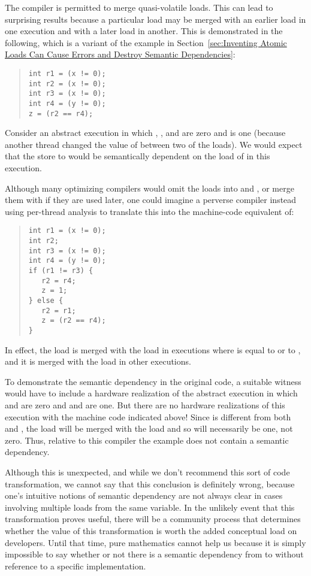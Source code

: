 The compiler is permitted to merge quasi-volatile loads.
This can lead to surprising results because a particular load
may be merged with an earlier load in one execution and with a
later load in another.
This is demonstrated in the following, which is a variant of
the example in
Section~\ref{sec:Inventing Atomic Loads Can Cause Errors and
Destroy Semantic Dependencies}:
\begin{quote}
\begin{verbatim}
int r1 = (x != 0);
int r2 = (x != 0);
int r3 = (x != 0);
int r4 = (y != 0);
z = (r2 == r4);
\end{verbatim}
\end{quote}
Consider an abstract execution in which , , and 
are zero and  is one (because another thread changed the value
of  between two of the loads).
We would expect that the store to  would be semantically
dependent on the load of  in this execution.

Although many optimizing compilers would omit the loads into 
and , or merge them with  if they are used later, one
could imagine a perverse compiler instead using per-thread analysis to
translate this into the machine-code equivalent of:
\begin{quote}
\begin{verbatim}
int r1 = (x != 0);
int r2;
int r3 = (x != 0);
int r4 = (y != 0);
if (r1 != r3) {
   r2 = r4;
   z = 1;
} else {
   r2 = r1;
   z = (r2 == r4);
}
\end{verbatim}
\end{quote}
In effect, the  load is merged with the  load in
executions where  is equal to  or to , and it is
merged with the  load in other executions.

To demonstrate the semantic dependency in the original code,
a suitable witness would have
to include a hardware realization of the abstract execution in which
 and  are zero and  and  are one.
But there are no hardware realizations of this execution with the
machine code indicated above!
Since  is different from both  and , the 
load will be merged with the  load and so  will
necessarily be one, not zero.
Thus, relative to this compiler the example does not contain a
semantic dependency.

Although this is unexpected, and while we don't recommend this sort of
code transformation, we cannot say that this conclusion is definitely
wrong, because one's intuitive notions of semantic dependency are not
always clear in cases involving multiple loads from the same variable.
In the unlikely event that this transformation proves useful, there
will be a community process that determines whether the value of this
transformation is worth the added conceptual load on developers.
Until that time, pure mathematics cannot help us because it is simply
impossible to say whether or not there is a semantic dependency from
 to  without reference to a specific implementation.

